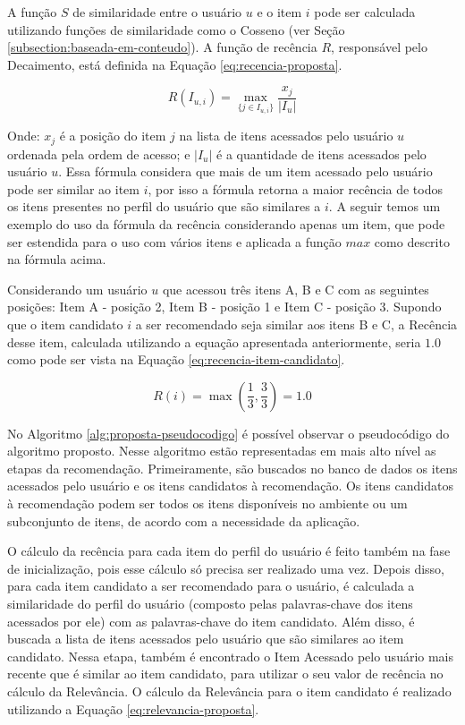 A função $S$ de similaridade entre o usuário $u$ e o item $i$ pode ser calculada utilizando funções de similaridade como
o Cosseno (ver Seção \ref{subsection:baseada-em-conteudo}). A função de recência $R$, responsável pelo Decaimento, está definida na Equação
\ref{eq:recencia-proposta}.

\begin{equation}
  R(I_{u,i}) = \max_{\{j \in I_{u,i}\}}{\frac{x_j}{\left| I_u \right|}}
  \label{eq:recencia-proposta}
\end{equation}

Onde: $x_j$ é a posição do item $j$ na lista de itens acessados pelo usuário $u$ ordenada pela ordem de acesso;
e $\left| I_u \right|$ é a quantidade de itens acessados pelo usuário $u$. Essa fórmula considera
que mais de um item acessado pelo usuário pode ser similar ao item $i$, por isso a fórmula retorna a maior recência de
todos os itens presentes no perfil do usuário que são similares a $i$. A seguir temos um exemplo do uso da fórmula da
recência considerando apenas um item, que pode ser estendida para o uso com vários itens e aplicada a função $max$ como descrito na
fórmula acima.

Considerando um usuário $u$ que acessou três itens A, B e C com as seguintes posições: Item A - posição 2, Item B - posição 1 e
Item C - posição 3. Supondo que o item candidato $i$ a ser recomendado seja similar aos itens B e C, a Recência desse item, calculada
utilizando a equação apresentada anteriormente, seria $1.0$ como pode ser vista na Equação \ref{eq:recencia-item-candidato}.

\begin{equation}
  R(i) = \max{(\frac{1}{3}, \frac{3}{3})} = 1.0
  \label{eq:recencia-item-candidato}
\end{equation}

No Algoritmo \ref{alg:proposta-pseudocodigo} é possível observar o pseudocódigo do algoritmo proposto. Nesse algoritmo
estão representadas em mais alto nível as etapas da recomendação. Primeiramente, são buscados no banco de dados os itens acessados
pelo usuário e os itens candidatos à recomendação. Os itens candidatos à recomendação podem ser todos os itens disponíveis
no ambiente ou um subconjunto de itens, de acordo com a necessidade da aplicação.

O cálculo da recência para cada item do perfil do usuário é feito também na fase de inicialização, pois esse cálculo só
precisa ser realizado uma vez. Depois disso, para cada item candidato a ser recomendado para o usuário, é calculada a
similaridade do perfil do usuário (composto pelas palavras-chave dos itens acessados por ele) com as palavras-chave do item
candidato. Além disso, é buscada a lista de itens acessados pelo usuário que são similares ao item candidato. Nessa etapa, também é
encontrado o Item Acessado pelo usuário mais recente que é similar ao item candidato, para utilizar o seu valor de recência no cálculo da Relevância.
O cálculo da Relevância para o item candidato é realizado utilizando a Equação \ref{eq:relevancia-proposta}.


